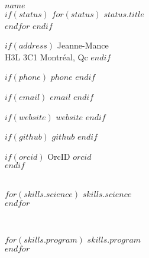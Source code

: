 \documentclass[$fontsize$, letterpaper]{article}
\begin{document}
{\Large \textbf{$name$}}\\[.2cm]
$if(status)$
$for(status)$
{\large{$status.title$}}\\
$endfor$
$endif$

\setlength{\columnsep}{-2cm}
\begin{multicols}{2}

$if(address)$
\faHome {} Jeanne-Mance \\ \hspace*{.6cm} H3L 3C1 Montréal, Qc
$endif$


$if(phone)$
\faPhone \quad $phone$
$endif$


$if(email)$
\faEnvelope \quad \href{mailto:$email$}{$email$}
$endif$


$if(website)$
\faGlobe \quad \href{http://$website$}{$website$}
$endif$


$if(github)$
\faGithub \quad \href{https://github.com/$github$}{$github$}
$endif$


$if(orcid)$
OrcID \quad \href{http://orcid.org/$orcid$}{$orcid$}\\
$endif$




\columnbreak

\vspace{2cm}

\setlength{\columnsep}{-1cm}
\begin{multicols}{2}


\\

$for(skills.science)$
$skills.science$\\
$endfor$


\columnbreak

\vspace{-.2cm}

\\

\vspace{-.08cm}

$for(skills.program)$
$skills.program$\\
$endfor$


\end{multicols}
\end{multicols}
\end{document}
